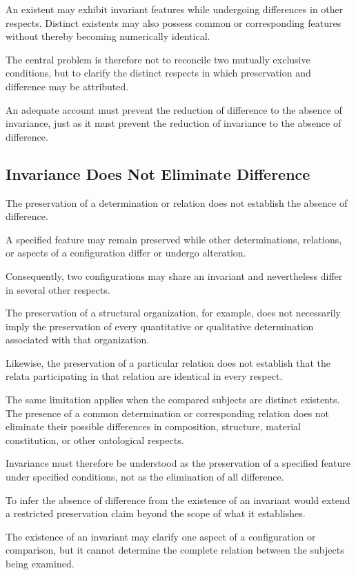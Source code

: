An existent may exhibit invariant features while
undergoing differences in other respects. Distinct
existents may also possess common or corresponding
features without thereby becoming numerically
identical.

The central problem is therefore not to reconcile
two mutually exclusive conditions, but to clarify
the distinct respects in which preservation and
difference may be attributed.

An adequate account must prevent the reduction
of difference to the absence of invariance, just
as it must prevent the reduction of invariance
to the absence of difference.

\subsection{Invariance Does Not Eliminate Difference}

The preservation of a determination or relation
does not establish the absence of difference.

A specified feature may remain preserved while
other determinations, relations, or aspects of
a configuration differ or undergo alteration.

Consequently, two configurations may share an
invariant and nevertheless differ in several
other respects.

The preservation of a structural organization,
for example, does not necessarily imply the
preservation of every quantitative or qualitative
determination associated with that organization.

Likewise, the preservation of a particular relation
does not establish that the relata participating
in that relation are identical in every respect.

The same limitation applies when the compared
subjects are distinct existents. The presence
of a common determination or corresponding relation
does not eliminate their possible differences
in composition, structure, material constitution,
or other ontological respects.

Invariance must therefore be understood as the
preservation of a specified feature under specified
conditions, not as the elimination of all difference.

To infer the absence of difference from the
existence of an invariant would extend a restricted
preservation claim beyond the scope of what it
establishes.

The existence of an invariant may clarify one
aspect of a configuration or comparison, but
it cannot determine the complete relation
between the subjects being examined.

